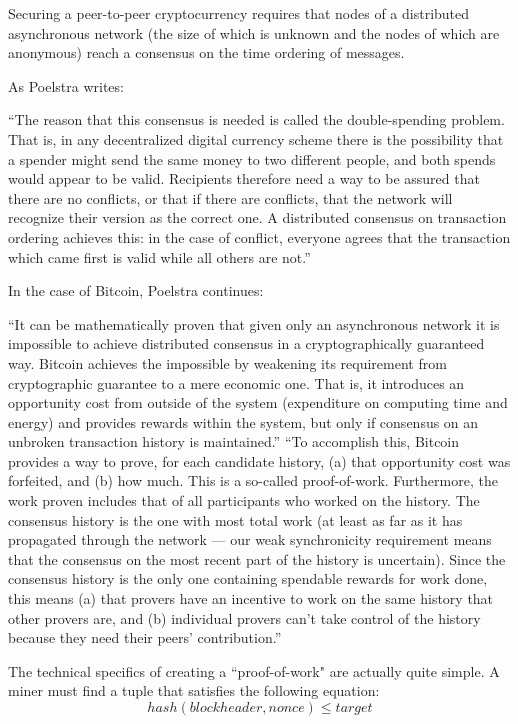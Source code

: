 \documentclass[a4paper,11pt]{article}
\begin{document}
Securing a peer-to-peer cryptocurrency requires that nodes of a distributed asynchronous network (the size of which is unknown and the nodes of which are anonymous) reach a consensus on the time ordering of messages.




As Poelstra writes\cite{distributedconsensus}:

``The reason that this consensus is needed is called the double-spending problem. That is, in any decentralized digital currency scheme there is the possibility that a spender might send the same money to two different people, and both spends would appear to be valid. Recipients therefore need a way to be assured that there are no conflicts, or that if there are conflicts, that the network will recognize their version as the correct one. A distributed consensus on transaction ordering achieves this: in the case of conflict, everyone agrees that the transaction which came first is valid while all others are not.''

In the case of Bitcoin, Poelstra continues:

``It can be mathematically proven that given only an asynchronous network it is impossible to achieve distributed consensus in a cryptographically guaranteed way\cite{Fischer}. Bitcoin achieves the impossible by weakening its requirement from cryptographic guarantee to a mere economic one. That is, it introduces an opportunity cost from outside of the system (expenditure on computing time and energy) and provides rewards within the system, but only if consensus on an unbroken transaction history is maintained.''
``To accomplish this, Bitcoin provides a way to prove, for each candidate history, (a) that opportunity cost was forfeited, and (b) how much. This is a so-called proof-of-work. Furthermore, the work proven includes that of all participants who worked on the history. The consensus history is the one with most total work (at least as far as it has propagated through the network — our weak synchronicity requirement means that the consensus on the most recent part of the history is uncertain). Since the consensus history is the only one containing spendable rewards for work done, this means (a) that provers have an incentive to work on the same history that other provers are, and (b) individual provers can't take control of the history because they need their peers' contribution.''

The technical specifics of creating a ``proof-of-work" are actually quite simple. A miner must find a tuple that satisfies the following equation:
$$ hash(blockheader,nonce)\leq target$$
\end{document}

